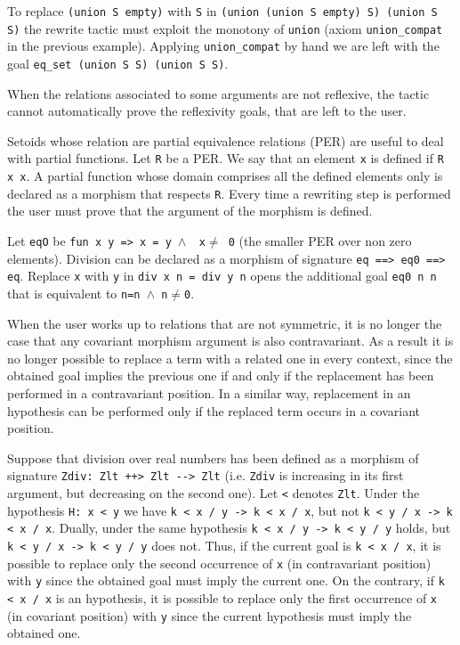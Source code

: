 \begin{cscexample}
To replace \texttt{(union S empty)} with \texttt{S} in
\texttt{(union (union S empty) S) (union S S)} the rewrite tactic must
exploit the monotony of \texttt{union} (axiom \texttt{union\_compat} in
the previous example). Applying \texttt{union\_compat} by hand we are left
with the goal \texttt{eq\_set (union S S) (union S S)}.
\end{cscexample}

When the relations associated to some arguments are not reflexive, the tactic
cannot automatically prove the reflexivity goals, that are left to the user.

Setoids whose relation are partial equivalence relations (PER)
are useful to deal with partial functions. Let \texttt{R} be a PER. We say
that an element \texttt{x} is defined if \texttt{R x x}. A partial function
whose domain comprises all the defined elements only is declared as a
morphism that respects \texttt{R}. Every time a rewriting step is performed
the user must prove that the argument of the morphism is defined.

\begin{cscexample}
Let \texttt{eqO} be \texttt{fun x y => x = y $\land$ ~x$\neq$ 0} (the smaller PER over
non zero elements). Division can be declared as a morphism of signature
\texttt{eq ==> eq0 ==> eq}. Replace \texttt{x} with \texttt{y} in
\texttt{div x n = div y n} opens the additional goal \texttt{eq0 n n} that
is equivalent to \texttt{n=n $\land$ n$\neq$0}.
\end{cscexample}

When the user works up to relations that are not symmetric, it is no longer
the case that any covariant morphism argument is also contravariant. As a
result it is no longer possible to replace a term with a related one in
every context, since the obtained goal implies the previous one if and
only if the replacement has been performed in a contravariant position.
In a similar way, replacement in an hypothesis can be performed only if
the replaced term occurs in a covariant position.

\begin{cscexample}
Suppose that division over real numbers has been defined as a
morphism of signature \texttt{Zdiv: Zlt ++> Zlt -{}-> Zlt} (i.e.
\texttt{Zdiv} is increasing in its first argument, but decreasing on the
second one). Let \texttt{<} denotes \texttt{Zlt}. 
Under the hypothesis \texttt{H: x < y} we have
\texttt{k < x / y -> k < x / x}, but not
\texttt{k < y / x -> k < x / x}.
Dually, under the same hypothesis \texttt{k < x / y -> k < y / y} holds,
but \texttt{k < y / x -> k < y / y} does not.
Thus, if the current goal is \texttt{k < x / x}, it is possible to replace
only the second occurrence of \texttt{x} (in contravariant position)
with \texttt{y} since the obtained goal must imply the current one.
On the contrary, if \texttt{k < x / x} is
an hypothesis, it is possible to replace only the first occurrence of
\texttt{x} (in covariant position) with \texttt{y} since
the current hypothesis must imply the obtained one.
\end{cscexample}

